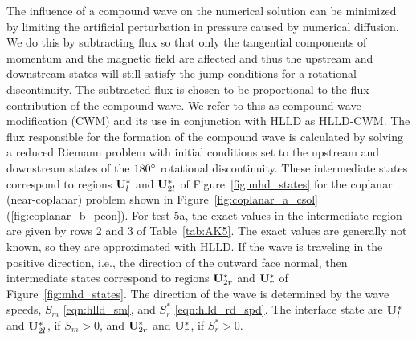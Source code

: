 
The influence of a compound wave on the numerical solution can be minimized by limiting the artificial perturbation in pressure caused by numerical diffusion.  We do this by subtracting flux so that only the tangential components of momentum and the magnetic field are affected and thus the upstream and downstream states will still satisfy the jump conditions for a rotational discontinuity.  The subtracted flux is chosen to be proportional to the flux contribution of the compound wave.  We refer to this as compound wave modification (CWM) and its use in conjunction with HLLD as HLLD-CWM.  The flux responsible for the formation of the compound wave is calculated by solving a reduced Riemann problem with initial conditions set to the upstream and downstream states of the $180^\circ$ rotational discontinuity.  These intermediate states correspond to regions $\mathbf{U}_{l}^*$ and $\mathbf{U}_{2l}^*$ of Figure~\ref{fig:mhd_states} for the coplanar (near-coplanar) problem shown in Figure~\ref{fig:coplanar_a_csol} (\ref{fig:coplanar_b_pcon}).  For test 5a, the exact values in the intermediate region are given by rows 2 and 3 of Table~\ref{tab:AK5}.  The exact values are generally not known, so they are approximated with HLLD.  If the wave is traveling in the positive direction, i.e., the direction of the outward face normal, then intermediate states correspond to regions $\mathbf{U}_{2r}^*$ and $\mathbf{U}_{r}^*$ of Figure~\ref{fig:mhd_states}.  The direction of the wave is determined by the wave speeds, $S_m$ \eqref{eqn:hlld_sm}, and $S^*_r$ \eqref{eqn:hlld_rd_spd}.  The interface state are $\mathbf{U}_{l}^*$ and $\mathbf{U}_{2l}^*$, if $S_m > 0$, and $\mathbf{U}_{2r}^*$ and $\mathbf{U}_{r}^*$, if $S^*_r > 0$. 

